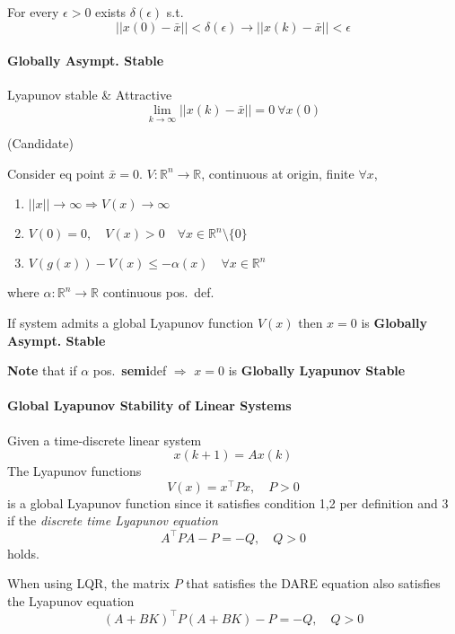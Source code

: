 
For every $\epsilon>0$ exists $\delta(\epsilon)$ s.t.\\
\noindent\begin{equation*}
    \lvert\lvert x(0) - \bar{x} \rvert\rvert < \delta(\epsilon) \to
    \lvert\lvert x(k) - \bar{x} \rvert\rvert < \epsilon
\end{equation*}

\paragraph{Globally Asympt. Stable}
Lyapunov stable \& Attractive
\noindent\begin{equation*}
    \lim_{k\to\infty} \lvert\lvert x(k) - \bar{x} \rvert\rvert = 0 \ \forall x(0)
\end{equation*}

\newpar{}
 (Candidate)

Consider eq point $\bar{x}=0$. $V:\mathbb{R}^n\to \mathbb{R}$, continuous at origin, finite $\forall x$,
\begin{enumerate}
    \item $\lvert\lvert x \rvert\rvert \to \infty \Rightarrow V(x) \to \infty$
    \item $V(0)=0, \quad V(x)>0 \quad \forall x \in \mathbb{R}^n \setminus\{0\}$
    \item $V(g(x)) - V(x) \leq -\alpha(x) \quad \forall x \in \mathbb{R}^n$
\end{enumerate}
where $\alpha:\mathbb{R}^n\to \mathbb{R}$ continuous pos.\ def.

\newpar{}

If system admits a global Lyapunov function $V(x)$ then $x=0$ is \textbf{Globally Asympt. Stable}

\newpar{}
\textbf{Note} that if $\alpha$ pos.\ \textbf{semi}def $\Rightarrow$ $x=0$ is \textbf{Globally Lyapunov Stable}

\paragraph{Global Lyapunov Stability of Linear Systems}
Given a time-discrete linear system 
\noindent\begin{equation*}
    x(k+1) = Ax(k)
\end{equation*}
The Lyapunov functions 
\noindent\begin{equation*}
    V(x) = x^\top P x, \quad P>0
\end{equation*}
is a global Lyapunov function since it satisfies condition 1,2 per definition and 3 if the \textit{discrete time Lyapunov equation}
\noindent\begin{equation*}
    A^\top PA -P = -Q, \quad Q>0
\end{equation*}
holds.

\newpar{}
When using LQR, the matrix $P$ that satisfies the DARE equation also satisfies the Lyapunov equation
\noindent\begin{equation*}
    {(A+BK)}^\top P{(A+BK)} -P = -Q, \quad Q>0
\end{equation*}
